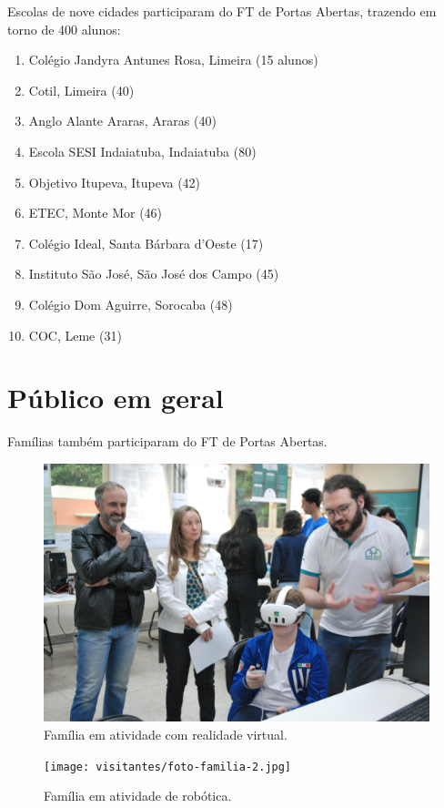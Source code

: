 \documentclass[
  letterpaper,
  DIV=11,
  numbers=noendperiod]{scrreprt}
\begin{document}
Escolas de nove cidades participaram do FT de Portas Abertas, trazendo
em torno de 400 alunos:

\begin{enumerate}
\def\labelenumi{\arabic{enumi}.}
\item
  Colégio Jandyra Antunes Rosa, Limeira (15 alunos)
\item
  Cotil, Limeira (40)
\item
  Anglo Alante Araras, Araras (40)
\item
  Escola SESI Indaiatuba, Indaiatuba (80)
\item
  Objetivo Itupeva, Itupeva (42)
\item
  ETEC, Monte Mor (46)
\item
  Colégio Ideal, Santa Bárbara d'Oeste (17)
\item
  Instituto São José, São José dos Campo (45)
\item
  Colégio Dom Aguirre, Sorocaba (48)
\item
  COC, Leme (31)
\end{enumerate}

\section{Público em geral}\label{puxfablico-em-geral}

Famílias também participaram do FT de Portas Abertas.

\begin{figure}[H]

{\centering \includegraphics[width=0.7\linewidth,height=\textheight,keepaspectratio]{visitantes/foto-familia.jpg}

}

\caption{Família em atividade com realidade virtual.}

\end{figure}%

\begin{figure}[H]

{\centering \texttt{[image: visitantes/foto-familia-2.jpg]}

}

\caption{Família em atividade de robótica.}

\end{figure}%
\end{document}
